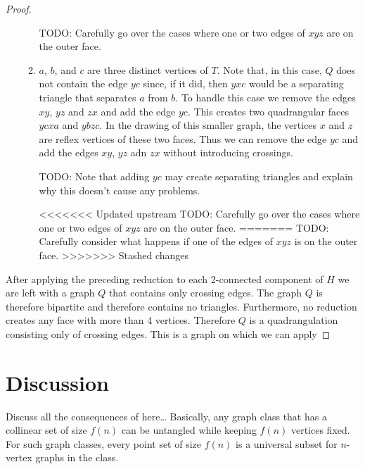 \documentclass{patmorin}
\begin{document}
\begin{proof}
\begin{enumerate}
\begin{enumerate}
            TODO: Carefully go over the cases where one or two edges of $xyz$ are on the outer face.

          \item $a$, $b$, and $c$ are three distinct vertices of $T$.
            Note that, in this case, $Q$ does not contain the edge $yc$
            since, if it did, then $yxc$ would be a separating triangle
            that separates $a$ from $b$.  To handle this case we remove
            the edges $xy$, $yz$ and $zx$ and add the edge $yc$.
            This creates two quadrangular faces $ycxa$ and $ybzc$.
            In the drawing of this smaller graph, the vertices $x$ and
            $z$ are reflex vertices of these two faces.  Thus we can
            remove the edge $yc$ and add the edges $xy$, $yz$ adn $zx$
            without introducing crossings.

            TODO: Note that adding $yc$ may create separating triangles and explain why this doesn't cause any problems.

<<<<<<< Updated upstream
            TODO: Carefully go over the cases where one or two edges of $xyz$ are on the outer face.
=======
            TODO: Carefully consider what happens if one of the edges of $xyz$ is on the outer face.
>>>>>>> Stashed changes
      \end{enumerate}
   \end{enumerate}
   After applying the preceding reduction to each 2-connected component
   of $H$ we are left with a graph $Q$ that contains only crossing
   edges.  The graph $Q$ is therefore bipartite and therefore contains
   no triangles.  Furthermore, no reduction creates any face with more
   than 4 vertices. Therefore $Q$ is a quadrangulation consisting only
   of crossing edges.  This is a graph on which we can apply 

\end{proof}



\section{Discussion}

Discuss all the consequences of  here\ldots
Basically, any graph class that has a collinear set of size $f(n)$ can 
be untangled while keeping $f(n)$ vertices fixed.  For such graph classes,
every point set of size $f(n)$ is a universal subset for $n$-vertex graphs
in the class.
\end{document}
